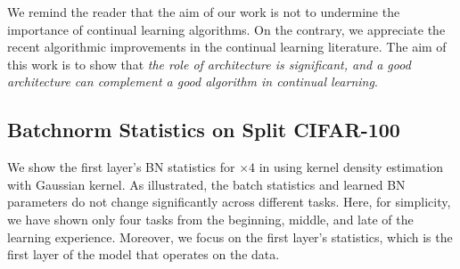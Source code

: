 We remind the reader that the aim of our work is not to undermine the importance of continual learning algorithms. On the contrary, we appreciate the recent algorithmic improvements in the continual learning literature. The aim of this work is to show that \emph{the role of architecture is significant, and a good architecture can complement a good algorithm in continual learning}.




\subsection{Batchnorm Statistics on Split CIFAR-100}
\label{sec:appendix-bn-cifar}
We show the first layer's BN statistics for \CNN$\times{4}$ in  using kernel density estimation with Gaussian kernel. As illustrated, the batch statistics and learned BN parameters do not change significantly across different tasks. Here, for simplicity, we have shown only four tasks from the beginning, middle, and late of the learning experience. Moreover, we focus on the first layer's statistics, which is the first layer of the model that operates on the data.

